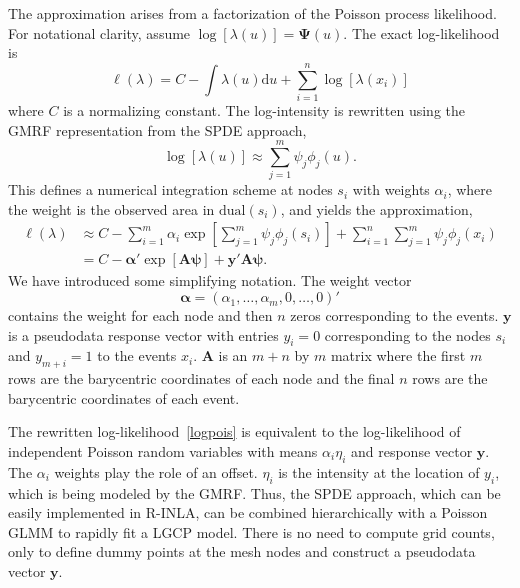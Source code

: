 \documentclass{interact}
\begin{document}
The approximation arises from a factorization of the Poisson process
likelihood. For notational clarity, assume \(\log[\lambda(u)]
= \boldsymbol{\Psi}(u)\). The exact log-likelihood is
\begin{equation}
\ell(\lambda) = C - \int \lambda(u) \mathrm{d}u
+ \sum_{i = 1}^{n} \log\left[\lambda(x_{i})\right]
\end{equation}
where \(C\) is a normalizing constant. The log-intensity is rewritten using the
GMRF representation from the SPDE approach,
\begin{equation}
\log\left[\lambda(u)\right]
\approx \sum_{j = 1}^{m} \psi_{j} \phi_{j}(u).
\end{equation}
This defines a numerical integration scheme at nodes \(s_{i}\)
with weights \(\alpha_{i}\), where the weight is the observed area in
\(\mathrm{dual}(s_{i})\), and yields the approximation,
\begin{align}
\ell(\lambda) &\approx C - \sum_{i = 1}^{m} \alpha_{i}
\exp\left[\sum_{j = 1}^{m} \psi_{j}\phi_{j}(s_{i})\right]
+ \sum_{i = 1}^{n} \sum_{j = 1}^{m} \psi_{j}\phi_{j}(x_{i}) \\
& = C - \boldsymbol{\alpha}'
\exp\left[\mathbf{A} \boldsymbol{\psi}\right]
+ \mathbf{y}' \mathbf{A} \boldsymbol{\psi}. \label{logpois}
\end{align}
We have introduced some simplifying notation. The weight vector
\begin{equation}
\boldsymbol{\alpha} = (\alpha_{1}, \dots, \alpha_{m}, 0, \dots, 0)'
\end{equation}
contains the weight for each node and then \(n\) zeros corresponding to the
events. \(\mathbf{y}\) is a pseudodata response vector with entries
\(y_{i} = 0\) corresponding to the nodes \(s_{i}\) and \(y_{m+i} = 1\) to the
events \(x_{i}\). \(\mathbf{A}\) is an \(m + n\) by \(m\) matrix where the
first \(m\) rows are the barycentric coordinates of each node and the final
\(n\) rows are the barycentric coordinates of each event.

The rewritten log-likelihood~\eqref{logpois} is equivalent to the log-likelihood of
independent Poisson random variables with means \(\alpha_{i} \eta_{i}\) and
response vector \(\mathbf{y}\). The \(\alpha_{i}\) weights play the role of
an offset. \(\eta_{i}\) is the intensity at the location of \(y_{i}\), which
is being modeled by the GMRF. Thus, the SPDE approach, which can be easily
implemented in R-INLA, can be combined hierarchically with a Poisson GLMM to
rapidly fit a LGCP model. There is no need to compute grid counts, only to
define dummy points at the mesh nodes and construct a pseudodata vector
\(\mathbf{y}\).
\end{document}
